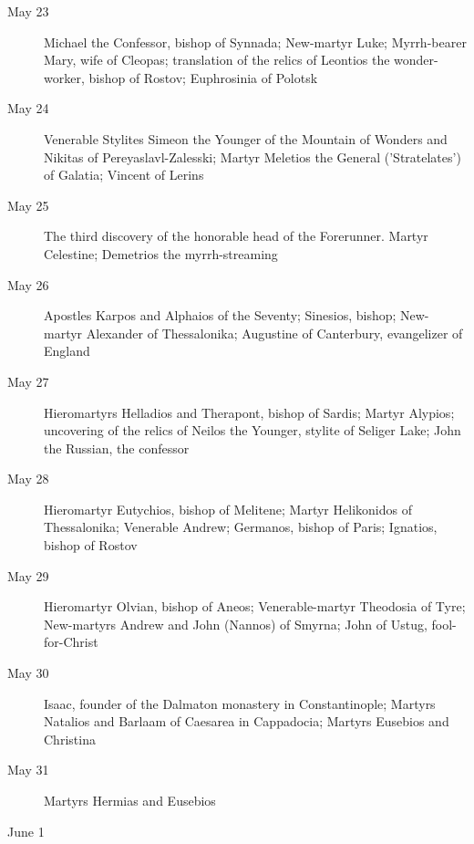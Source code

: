 \begin{description}
\item[May 23]

Michael the Confessor, bishop of Synnada; New-martyr Luke; Myrrh-bearer Mary, wife of Cleopas; translation of the relics of Leontios the wonder-worker, bishop of Rostov; Euphrosinia of Polotsk

\item[May 24]

Venerable Stylites Simeon the Younger of the Mountain of Wonders and Nikitas of Pereyaslavl-Zalesski; Martyr Meletios the General ('Stratelates') of Galatia; Vincent of Lerins

\item[May 25]

The third discovery of the honorable head of the Forerunner. Martyr Celestine; Demetrios the myrrh-streaming

\item[May 26]

Apostles Karpos and Alphaios of the Seventy; Sinesios, bishop; New-martyr Alexander of Thessalonika; Augustine of Canterbury, evangelizer of England

\item[May 27]

Hieromartyrs Helladios and Therapont, bishop of Sardis; Martyr Alypios; uncovering of the relics of Neilos the Younger, stylite of Seliger Lake; John the Russian, the confessor

\item[May 28]

Hieromartyr Eutychios, bishop of Melitene; Martyr Helikonidos of Thessalonika; Venerable Andrew; Germanos, bishop of Paris; Ignatios, bishop of Rostov

\item[May 29]

Hieromartyr Olvian, bishop of Aneos; Venerable-martyr Theodosia of Tyre; New-martyrs Andrew and John (Nannos) of Smyrna; John of Ustug, fool-for-Christ

\item[May 30]

Isaac, founder of the Dalmaton monastery in Constantinople; Martyrs Natalios and Barlaam of Caesarea in Cappadocia; Martyrs Eusebios and Christina

\item[May 31]

Martyrs Hermias and Eusebios

\item[June 1]


\end{description}
